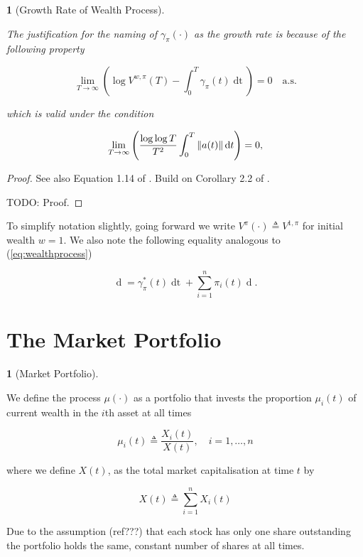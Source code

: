 \documentclass[british]{amsart}
\numberwithin{equation}{section}
\numberwithin{figure}{section}
\theoremstyle{plain}
\theoremstyle{definition}
\newtheorem{defn}[thm]{\protect\definitionname}
\theoremstyle{plain}
\theoremstyle{plain}
\theoremstyle{plain}
\newtheorem{prop}[thm]{\protect\propositionname}
\theoremstyle{remark}
\theoremstyle{plain}
\providecommand{\definitionname}{Definition}
\providecommand{\propositionname}{Proposition}
\renewcommand{\d}[1]{\mathop{\mathrm{d}{#1}}}
\newcommand{\defeq}{\mathop{\triangleq}}
\newcommand{\almostsurely}{\text{a.s.}}
\newcommand{\rangei}{i=1,\dots,n}
\begin{document}
\begin{prop} [Growth Rate of Wealth Process]
	\label{thm:wealthgrowthrate}

	The justification for the naming of $\gamma_{\pi}(\cdot)$ as the \textit{growth rate} is because of the following property

	\begin{equation*}
		\lim_{T \to \infty} 
			\left( 
			\log{V^{w,\pi}(T)} - \int_{0}^{T} \gamma_{\pi}(t)\d{t} 
			\right) = 0
		\quad \almostsurely
	\end{equation*}

	which is valid under the condition

	\begin{equation*}
		\lim_{T \to \infty}
			\left(
				\frac{\log \log T}{T^2} \int_{0}^{T} \norm{ a(t) } \d{t}
			\right) = 0,
	\end{equation*}

\end{prop}

\begin{proof}
	See also Equation 1.14 of \cite{fernholz2009}.
	Build on Corollary 2.2 of \cite{fernholz1999pgf}.

	TODO: Proof.
\end{proof}

To simplify notation slightly, going forward we write $V^{\pi}(\cdot) \defeq V^{1,\pi}$ for initial wealth $w=1$. We also note the following equality analogous to (\ref{eq:wealthprocess})

\begin{equation}
	\label{eq:logvalueprocess}
		\d{\log V^{\pi}(t)} = \gamma_{\pi}^{*}(t)\d{t} + \sum_{i=1}^{n} \pi_{i}(t) \d{\log{X_{i}(t)}}.
\end{equation}

\newpage

\section{The Market Portfolio}

\begin{defn} [Market Portfolio]
	\label{def:marketportfolio}

	We define the process $\mu(\cdot)$ as a portfolio that invests the proportion
	$\mu_{i}(t)$ of current wealth in the $i$th asset at all times

	\begin{equation}
		\label{eq:marketportfolio}
		\mu_{i}(t) \defeq \frac{X_{i}(t)}{X(t)},
		\quad \rangei	
	\end{equation}

	where we define $X(t)$, as the total market capitalisation at time $t$ by

	\begin{equation}
		\label{eq:totalmarketcapitalisation}
		X(t) \defeq \sum_{i=1}^{n} X_{i}(t)	
	\end{equation}

  Due to the	assumption (ref???) that each stock has only one share outstanding the portfolio
	holds the same, constant number of shares at all times.

\end{defn}
\end{document}
